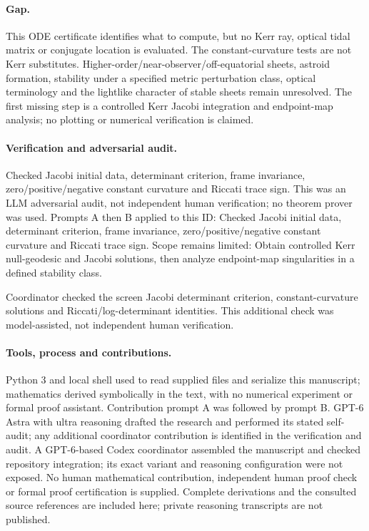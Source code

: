 \documentclass[11pt]{article}
\begin{document}
\paragraph{Gap.}This ODE certificate identifies what to compute, but no Kerr ray, optical tidal matrix or conjugate location is evaluated. The constant-curvature tests are not Kerr substitutes. Higher-order/near-observer/off-equatorial sheets, astroid formation, stability under a specified metric perturbation class, optical terminology and the lightlike character of stable sheets remain unresolved. The first missing step is a controlled Kerr Jacobi integration and endpoint-map analysis; no plotting or numerical verification is claimed.

\paragraph{Verification and adversarial audit.}
Checked Jacobi initial data, determinant criterion, frame invariance, zero/positive/negative constant curvature and Riccati trace sign. This was an LLM adversarial audit, not independent human verification; no theorem prover was used. Prompts A then B applied to this ID: Checked Jacobi initial data, determinant criterion, frame invariance, zero/positive/negative constant curvature and Riccati trace sign. Scope remains limited: Obtain controlled Kerr null-geodesic and Jacobi solutions, then analyze endpoint-map singularities in a defined stability class.

Coordinator checked the screen Jacobi determinant criterion, constant-curvature solutions and Riccati/log-determinant identities. This additional check was model-assisted, not independent human verification.

\paragraph{Tools, process and contributions.}
Python 3 and local shell used to read supplied files and serialize this manuscript; mathematics derived symbolically in the text, with no numerical experiment or formal proof assistant. Contribution prompt A was followed by prompt B. GPT-6 Astra with ultra reasoning drafted the research and performed its stated self-audit; any additional coordinator contribution is identified in the verification and audit. A GPT-6-based Codex coordinator assembled the manuscript and checked repository integration; its exact variant and reasoning configuration were not exposed. No human mathematical contribution, independent human proof check or formal proof certification is supplied. Complete derivations and the consulted source references are included here; private reasoning transcripts are not published.
\end{document}
